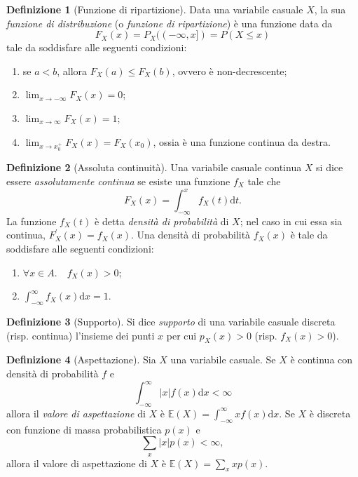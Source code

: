 \documentclass[fontsize=11pt,paper=A4,oneside,index=totoc,hyperref]{book}
\theoremstyle{definition}
\newtheorem{dfn}{Definizione}[]
\theoremstyle{plain}
\newcommand{\Asp}{\mathbb{E}}
\begin{document}
\begin{dfn}[Funzione di ripartizione]
  Data una variabile casuale \(X\), la sua \emph{funzione di distribuzione} (o \emph{funzione di ripartizione}) è una funzione data da
  \begin{equation}
    F_X(x) = P_X((-\infty,x]) = P(X \le x)
  \end{equation}
  tale da soddisfare alle seguenti condizioni:
  \begin{enumerate}
    \item se \(a<b\), allora \(F_X(a) \le F_X(b)\), ovvero è non-decrescente;
    \item \(\lim_{x\to-\infty}F_X(x) = 0\);
    \item \(\lim_{x\to\infty}F_X(x) = 1\);
    \item \(\lim_{x\to x_0^{+}} F_X(x) = F_X(x_0)\), ossia è una funzione continua da destra.
  \end{enumerate}
\end{dfn}

\begin{dfn}[Assoluta continuità]
  Una variabile casuale continua \(X\) si dice essere \emph{assolutamente continua} se esiste una funzione \(f_X\) tale che
  \begin{equation}
    F_X(x) = \int_{-\infty}^x f_X(t) \mathrm{d}t.
  \end{equation}
  La funzione \(f_X(t)\) è detta \emph{densità di probabilità} di \(X\); nel caso in cui essa sia continua, \(F_X^\prime(x) = f_X(x)\). Una densità di probabilità \(f_X(x)\) è tale da soddisfare alle seguenti condizioni:
  \begin{enumerate}
    \item \(\forall x \in A.\quad f_X(x) > 0\);
    \item \(\int_{-\infty}^\infty f_X(x) \mathrm{d}x = 1\).
  \end{enumerate}
\end{dfn}

\begin{dfn}[Supporto]
  Si dice \emph{supporto} di una variabile casuale discreta (risp. continua) l'insieme dei punti \(x\) per cui \(p_X(x) > 0\) (risp. \(f_X(x) > 0\)).
\end{dfn}

\begin{dfn}[Aspettazione]
  Sia \(X\) una variabile casuale. Se \(X\) è continua con densità di probabilità \(f\) e
  \[
  \int_{-\infty}^{\infty}\lvert x\rvert f(x) \mathrm{d}x < \infty
  \]
  allora il \emph{valore di aspettazione} di \(X\) è \(\Asp(X) = \int_{-\infty}^{\infty}xf(x)\mathrm{d}x\). Se \(X\) è discreta con funzione di massa probabilistica \(p(x)\) e
  \[
  \sum_x \lvert x\rvert p(x) < \infty,
  \]
  allora il valore di aspettazione di \(X\) è \(\Asp(X) = \sum_x xp(x)\).
\end{dfn}
\end{document}
